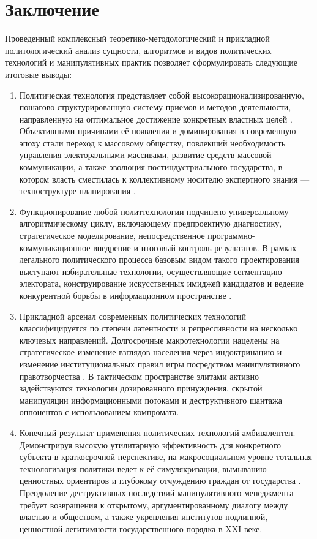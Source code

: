 \section*{Заключение}

Проведенный комплексный теоретико-методологический и прикладной политологический анализ сущности, алгоритмов и видов политических технологий и манипулятивных практик позволяет сформулировать следующие итоговые выводы:

\begin{enumerate}
    \item Политическая технология представляет собой высокорационализированную, пошагово структурированную систему приемов и методов деятельности, направленную на оптимальное достижение конкретных властных целей \cite{Solovyev}. Объективными причинами её появления и доминирования в современную эпоху стали переход к массовому обществу, повлекший необходимость управления электоральными массивами, развитие средств массовой коммуникации, а также эволюция постиндустриального государства, в котором власть сместилась к коллективному носителю экспертного знания — техноструктуре планирования \cite{Gelbreyt}.
    \item Функционирование любой политтехнологии подчинено универсальному алгоритмическому циклу, включающему предпроектную диагностику, стратегическое моделирование, непосредственное программно-коммуникационное внедрение и итоговый контроль результатов. В рамках легального политического процесса базовым видом такого проектирования выступают избирательные технологии, осуществляющие сегментацию электората, конструирование искусственных имиджей кандидатов и ведение конкурентной борьбы в информационном пространстве \cite{Solovyev}.
    \item Прикладной арсенал современных политических технологий классифицируется по степени латентности и репрессивности на несколько ключевых направлений. Долгосрочные макротехнологии нацелены на стратегическое изменение взглядов населения через индоктринацию и изменение институциональных правил игры посредством манипулятивного правотворчества \cite{Toschenko}. В тактическом пространстве элитами активно задействуются технологии дозированного принуждения, скрытой манипуляции информационными потоками и деструктивного шантажа оппонентов с использованием компромата.
    \item Конечный результат применения политических технологий амбивалентен. Демонстрируя высокую утилитарную эффективность для конкретного субъекта в краткосрочной перспективе, на макросоциальном уровне тотальная технологизация политики ведет к её симулякризации, вымыванию ценностных ориентиров и глубокому отчуждению граждан от государства \cite{Toschenko}. Преодоление деструктивных последствий манипулятивного менеджмента требует возвращения к открытому, аргументированному диалогу между властью и обществом, а также укрепления институтов подлинной, ценностной легитимности государственного порядка в XXI веке.
\end{enumerate}